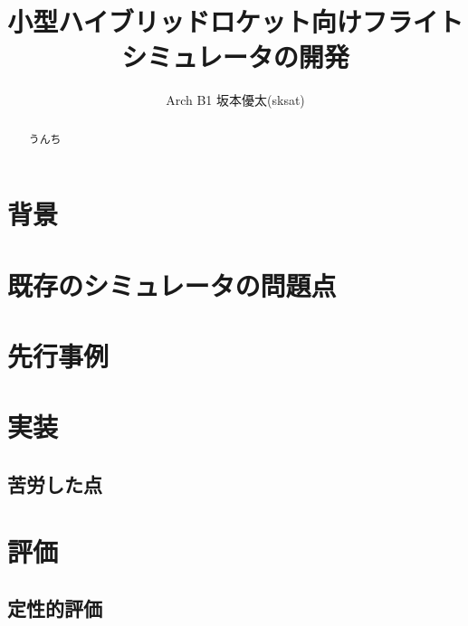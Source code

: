 \documentclass[a4j,10pt]{jsarticle}
\begin{document}

\title{小型ハイブリッドロケット向けフライトシミュレータの開発}

\author{
	Arch B1 坂本優太(sksat)
}

\begin{abstract}
うんち
\end{abstract}

\maketitle
\thispagestyle{empty}

\section{背景}

\section{既存のシミュレータの問題点}


\section{先行事例}

\section{実装}

\subsection{苦労した点}

\section{評価}
\subsection{定性的評価}
\end{document}
